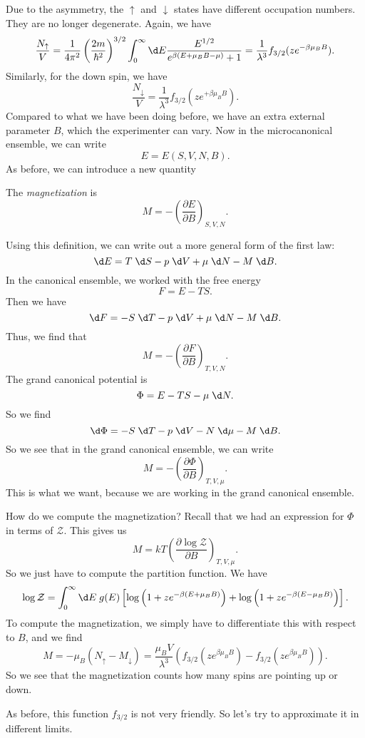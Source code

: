 \documentclass[a4paper]{article}
\begin{document}
Due to the asymmetry, the $\uparrow$ and $\downarrow$ states have different occupation numbers. They are no longer degenerate. Again, we have
\[
  \frac{N_{\uparrow}}{V} = \frac{1}{4\pi^2} \left(\frac{2m}{\hbar^2}\right)^{3/2} \int_0^\infty \d E \frac{E^{1/2}}{e^{\beta(E + \mu_B B - \mu)} + 1} = \frac{1}{\lambda^3} f_{3/2}(z e^{-\beta \mu_B B}).
\]
Similarly, for the down spin, we have
\[
  \frac{N_\downarrow}{V} = \frac{1}{\lambda^3} f_{3/2} (z e^{+\beta \mu_B B}).
\]
Compared to what we have been doing before, we have an extra external parameter $B$, which the experimenter can vary. Now in the microcanonical ensemble, we can write
\[
  E = E(S, V, N, B).
\]
As before, we can introduce a new quantity
\begin{defi}[Magnetization]
  The \emph{magnetization} is
  \[
    M = -\left(\frac{\partial E}{\partial B}\right)_{S, V, N}.
  \]
\end{defi}
Using this definition, we can write out a more general form of the first law:
\[
  \d E = T \;\d S - p \;\d V + \mu \;\d N - M \;\d B.
\]
In the canonical ensemble, we worked with the free energy
\[
  F = E - TS.
\]
Then we have
\[
  \d F = - S \;\d T - p \;\d V + \mu \;\d N - M \;\d B.
\]
Thus, we find that
\[
  M = -\left(\frac{\partial F}{\partial B}\right)_{T, V, N}.
\]
The grand canonical potential is
\[
  \Phi = E - TS - \mu \;\d N.
\]
So we find
\[
  \d\Phi = - S \;\d T - p \;\d V - N \;\d \mu - M \;\d B.
\]
So we see that in the grand canonical ensemble, we can write
\[
  M = -\left(\frac{\partial \Phi}{\partial B}\right)_{T, V, \mu}.
\]
This is what we want, because we are working in the grand canonical ensemble.

How do we compute the magnetization? Recall that we had an expression for $\Phi$ in terms of $\mathcal{Z}$. This gives us
\[
  M = kT \left(\frac{\partial \log \mathcal{Z}}{\partial B}\right)_{T, V, \mu}.
\]
So we just have to compute the partition function. We have
\[
  \log \mathcal{Z} = \int_0^\infty \d E\; g(E) \left[\log \left(1 + ze^{-\beta(E + \mu_B B)}\right) + \log \left(1 + z e^{-\beta (E - \mu_B B)}\right)\right].
\]
To compute the magnetization, we simply have to differentiate this with respect to $B$, and we find
\[
  M = - \mu_B (N_{\uparrow} - M_{\downarrow}) = \frac{\mu_B V}{\lambda^3} (f_{3/2}(z e^{\beta \mu_B B}) - f_{3/2}(z e^{\beta\mu_B B})).
\]
So we see that the magnetization counts how many spins are pointing up or down.

As before, this function $f_{3/2}$ is not very friendly. So let's try to approximate it in different limits.
\end{document}
